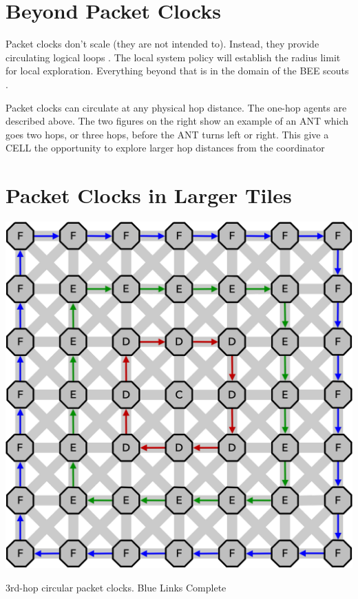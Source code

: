 \section{Beyond Packet Clocks}

Packet clocks don't scale (they are not intended to). Instead, they provide circulating logical loops \cite{Logical Clocks}.  The local system policy will establish the radius limit for local exploration. Everything beyond that is in the domain of the BEE scouts .

Packet clocks can circulate at any physical hop distance. The one-hop agents are described above.  The two figures on the right show an example of an ANT which goes two hops, or three hops, before the ANT turns left or right.  This give a CELL the opportunity to explore larger hop distances from the coordinator

\section{Packet Clocks in Larger Tiles}

 \begin{marginfigure}
        \includegraphics[width=\linewidth,trim=0mm 0mm 0mm 0mm, clip]{../../FIGURES/7x7-clock.pdf} %
  \caption{3rd-hop circular packet clocks. Blue Links Complete}
    \vspace{20pt}
\end{marginfigure}

